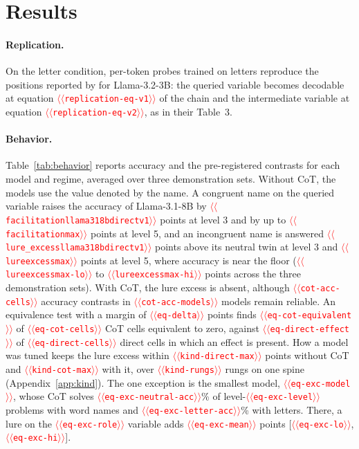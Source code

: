 \documentclass[11pt]{article}
\providecommand{\NUM}[1]{\textcolor{red}{$\langle\langle$\texttt{#1}$\rangle\rangle$}}
\begin{document}
\section{Results}

\paragraph{Replication.} On the letter condition, per-token probes trained on letters reproduce
the positions reported by \citeauthor{kudo2026faithful} for Llama-3.2-3B: the queried variable
becomes decodable at equation \NUM{replication-eq-v1} of the chain and the intermediate variable
at equation \NUM{replication-eq-v2}, as in their Table~3.

\paragraph{Behavior.} Table~\ref{tab:behavior} reports accuracy and the pre-registered
contrasts for each model and regime, averaged over three demonstration sets. Without CoT, the
models use the value denoted by the name. A congruent name on the queried variable raises the
accuracy of Llama-3.1-8B by \NUM{facilitationllama318bdirectv1} points at level 3 and by up to
\NUM{facilitationmax} points at level 5, and an incongruent name is answered
\NUM{lure_excessllama318bdirectv1} points above its neutral twin at level 3 and \NUM{lureexcessmax}
points at level 5, where accuracy is near the floor (\NUM{lureexcessmax-lo} to
\NUM{lureexcessmax-hi} points across the three demonstration sets). With CoT, the lure excess is
absent, although \NUM{cot-acc-cells} accuracy contrasts in \NUM{cot-acc-models} models remain reliable. An equivalence test with a margin of \NUM{eq-delta} points finds
\NUM{eq-cot-equivalent} of \NUM{eq-cot-cells} CoT cells equivalent to zero, against
\NUM{eq-direct-effect} of \NUM{eq-direct-cells} direct cells in which an effect is present. How a model was tuned keeps the lure excess within \NUM{kind-direct-max} points without CoT and \NUM{kind-cot-max} with it, over \NUM{kind-rungs} rungs on one spine
(Appendix~\ref{app:kind}). The one exception is the smallest model, \NUM{eq-exc-model}, whose CoT solves
\NUM{eq-exc-neutral-acc}\% of level-\NUM{eq-exc-level} problems with word names and
\NUM{eq-exc-letter-acc}\% with letters. There, a lure on the \NUM{eq-exc-role} variable adds
\NUM{eq-exc-mean} points [\NUM{eq-exc-lo}, \NUM{eq-exc-hi}].
\end{document}
